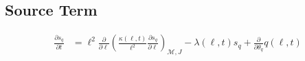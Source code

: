 \subsection*{Source Term}

\begin{equation}\label{eq:psdSensitivityQ}
    \begin{aligned}
        \frac{\partial{s_{q}}}{\partial{t}} &= \ell^2 \frac{\partial}{\partial{\ell}} \left( 
            \frac{\kappa(\ell, t)}{\ell^{2}} \frac{\partial{s_{q}}}{\partial{\ell}} 
        \right)_{\mathcal{M}, J}
         - \lambda(\ell, t) s_{q}
         + \frac{\partial}{\partial{\theta_{q}}}q(\ell, t)
    \end{aligned}
\end{equation}
